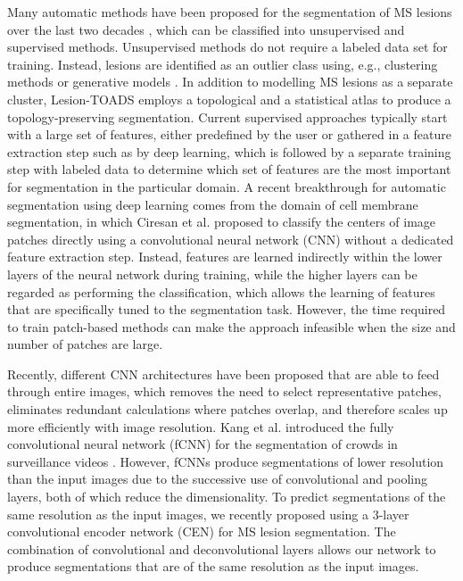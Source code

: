Many automatic methods have been proposed for the segmentation of MS
\mbox{lesions} over the last two decades \cite{garcia2013review}, which can be
classified into unsupervised and supervised methods. Unsupervised methods do not
require a labeled data set for training. Instead, lesions are identified as an
outlier class using, e.g., clustering methods
\cite{souplet2008,shiee2010topology} or generative models \cite{weiss2013}. In
addition to modelling MS lesions as a separate cluster, Lesion-TOADS
\cite{shiee2010topology} employs a topological and a statistical atlas to
produce a topology-preserving segmentation. Current supervised approaches
typically start with a large set of features, either predefined by the user
\cite{geremia2010} or gathered in a feature extraction step such as by deep
learning\cite{yoo2014}, which is followed by a separate training step with
labeled data to determine which set of features are the most important for
segmentation in the particular domain.
A recent breakthrough for automatic segmentation using deep learning comes from
the domain of cell membrane segmentation, in which Ciresan et al.
\cite{Ciresan2012} proposed to classify the centers of image patches directly
using a convolutional neural network (CNN) \cite{LeCun1998} without a dedicated
feature extraction step. Instead, features are learned indirectly within the
lower layers of the neural network during training, while the higher layers can
be regarded as performing the classification, which allows the learning of
features that are specifically tuned to the segmentation task. However, the time
required to train patch-based methods can make the approach infeasible when the
size and number of patches are large.


Recently, different CNN architectures
\cite{ronneberger2015,brosch2015,kang2014fully} have been proposed that are able
to feed through entire images, which removes the need to select representative
patches, eliminates redundant calculations where patches overlap, and therefore
scales up more efficiently with image resolution. Kang et al. introduced the
fully convolutional neural network (fCNN) for the segmentation of crowds in
surveillance videos \cite{kang2014fully}. However, fCNNs produce segmentations
of lower resolution than the input images due to the successive use of
convolutional and pooling layers, both of which reduce the dimensionality.
To predict segmentations of the same resolution as the input images, we recently
proposed using a 3-layer convolutional encoder network (CEN) \cite{brosch2015}
for MS lesion segmentation. The combination of convolutional \cite{LeCun1998}
and deconvolutional \cite{zeiler2011} layers allows our network to produce
segmentations that are of the same resolution as the input images. 

